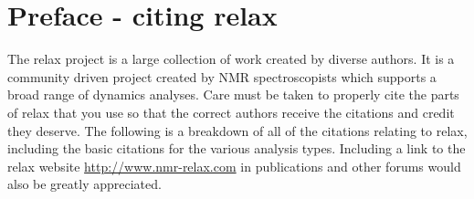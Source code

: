 


\chapter{Preface - citing relax} \label{ch: citations}

The relax project is a large collection of work created by diverse authors.
It is a community driven project created by NMR spectroscopists which supports a broad range of dynamics analyses.
Care must be taken to properly cite the parts of relax that you use so that the correct authors receive the citations and credit they deserve.
The following is a breakdown of all of the citations relating to relax, including the basic citations for the various analysis types.
Including a link to the relax website \url{http://www.nmr-relax.com} in publications and other forums would also be greatly appreciated.




